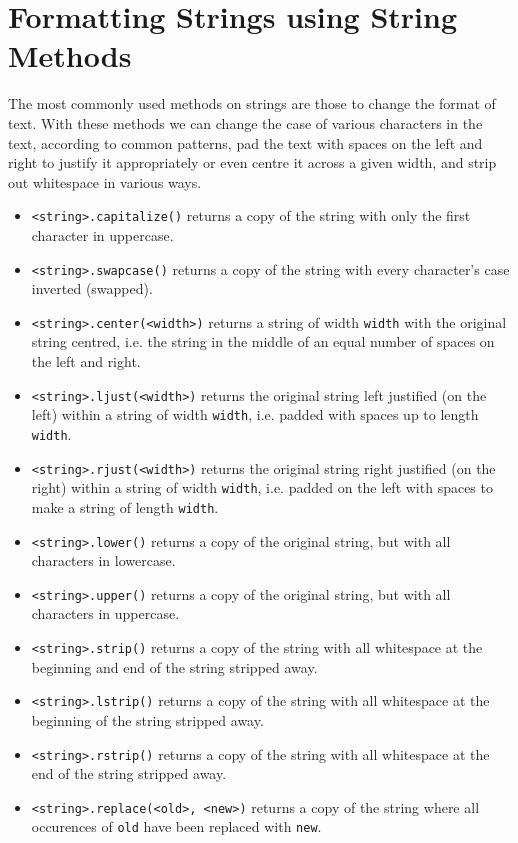 \section{Formatting Strings using String Methods}

The most commonly used methods on strings are those to change the   format of text. With these methods we can change the case of various   characters in the text, according to common patterns, pad the text with   spaces on the left and right to justify it appropriately or even centre   it across a given width, and strip out whitespace in various ways.
\begin{itemize}
	\item 
\texttt{<string>.capitalize()} returns a copy of the    string with only the first character in uppercase.
	\item 
\texttt{<string>.swapcase()} returns a copy of the    string with every character's case inverted (swapped).
	\item 
\texttt{<string>.center(<width>)} returns a    string of width \texttt{width} with the original string centred, i.e.       the string in the middle of an equal number of spaces on the left       and right.
	\item 
\texttt{<string>.ljust(<width>)} returns the    original string left justified (on the left) within a string of width \texttt{width},    i.e. padded with spaces up to length \texttt{width}.
	\item 
\texttt{<string>.rjust(<width>)} returns the    original string right justified (on the right) within a string of width \texttt{width},    i.e. padded on the left with spaces to make a string of length    \texttt{width}.
	\item 
\texttt{<string>.lower()} returns a copy of the    original string, but with all characters in lowercase.
	\item 
\texttt{<string>.upper()} returns a copy of the    original string, but with all characters in uppercase.
	\item 
\texttt{<string>.strip()} returns a copy of the    string with all whitespace at the beginning and end of the string    stripped away.
	\item 
\texttt{<string>.lstrip()} returns a copy of the    string with all whitespace at the beginning of the string stripped    away.
	\item 
\texttt{<string>.rstrip()} returns a copy of the    string with all whitespace at the end of the string stripped    away.
	\item 
\texttt{<string>.replace(<old>, <new>)}    returns a copy of the string where all occurences of \texttt{old}       have been replaced with \texttt{new}.
\end{itemize}
